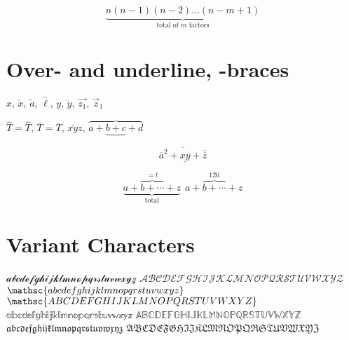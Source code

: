 \documentclass{article}
\begin{document}
$$
\underbrace{n(n-1)(n-2)\dots(n-m+1)}_{\mbox{total of $m$ factors}}
$$

\section{Over- and underline, -braces}

$\hat{x}$, $\check{x}$, $\tilde{a}$, 
$\bar{\ell}$, $\dot{y}$, $\ddot{y}$, 
$\vec{z_1}$, $\vec{z}_1$

$\hat{T} = \widehat{T}$,
$\bar{T} = \overline{T}$, $\widetilde{xyz}$,
$\overbrace{a+\underbrace{b+c}+d}$

$$
 \overline{\overline{a}^2+\underline{xy}
 +\overline{\overline{z}}}
$$

$$
\underbrace{a+\overbrace{b+\cdots}^{{}=t}+z}
_{\mathrm{total}} ~~
a+{\overbrace{b+\cdots}}^{126}+z
$$

\section{Variant Characters}
$ \mathcal{abcdefghijklmnopqrstuvwxyz} $
$ \mathcal{ABCDEFGHIJKLMNOPQRSTUVWXYZ} $
$ \mathsc{abcdefghijklmnopqrstuvwxyz} $
$ \mathsc{ABCDEFGHIJKLMNOPQRSTUVWXYZ} $
$ \mathbb{abcdefghijklmnopqrstuvwxyz} $
$ \mathbb{ABCDEFGHIJKLMNOPQRSTUVWXYZ} $
$ \mathfrak{abcdefghijklmnopqrstuvwxyz} $
$ \mathfrak{ABCDEFGHIJKLMNOPQRSTUVWXYZ} $
\end{document}
